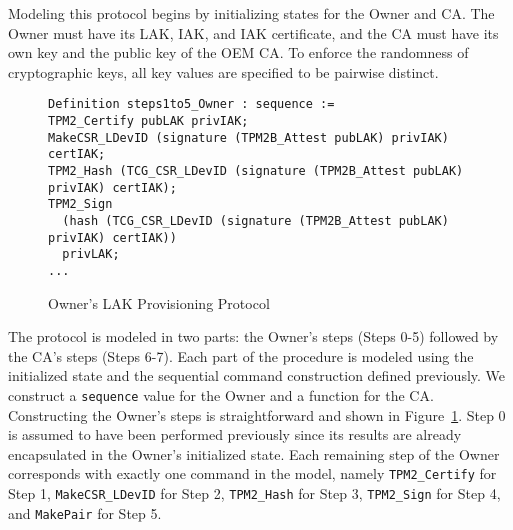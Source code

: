 \documentclass[runningheads]{llncs}
\begin{document}
Modeling this protocol begins by initializing states for the Owner and
CA. The Owner must have its LAK, IAK, and IAK certificate, and the CA
must have its own key and the public key of the OEM CA.  
To enforce the randomness of cryptographic
keys, all key values are specified to be pairwise distinct.




\begin{figure}[hpbt]
  \vspace{-\medskipamount}
  \vspace{-\medskipamount}
\begin{lstlisting}[language=Coq]
Definition steps1to5_Owner : sequence :=
TPM2_Certify pubLAK privIAK;
MakeCSR_LDevID (signature (TPM2B_Attest pubLAK) privIAK) certIAK;
TPM2_Hash (TCG_CSR_LDevID (signature (TPM2B_Attest pubLAK) privIAK) certIAK);
TPM2_Sign 
  (hash (TCG_CSR_LDevID (signature (TPM2B_Attest pubLAK) privIAK) certIAK))
  privLAK;
...
\end{lstlisting}
\caption{Owner's LAK Provisioning Protocol}
\label{fig:lak_model_Owner}
\end{figure}

The protocol is modeled in two parts: the Owner's steps (Steps 0-5)
followed by the CA's steps (Steps 6-7).  Each part of the procedure is
modeled using the initialized state and the sequential command
construction defined previously.  We construct a \verb|sequence| value
for the Owner and a function for the CA. Constructing the Owner's
steps is straightforward and shown in
Figure~\ref{fig:lak_model_Owner}. Step 0 is assumed to have been
performed previously since its results are already encapsulated in the
Owner's initialized state.  Each remaining step of the Owner
corresponds with exactly one command in the model, namely
\verb|TPM2_Certify| for Step 1, \verb|MakeCSR_LDevID| for Step 2,
\verb|TPM2_Hash| for Step 3, \verb|TPM2_Sign| for Step 4, and
\verb|MakePair| for Step 5.
\end{document}
